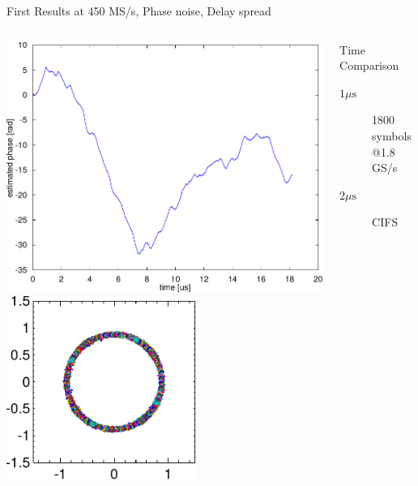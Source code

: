 \documentclass[10pt]{beamer}
\begin{document}
\begin{frame}{First Results at 450 MS/s, Phase noise, Delay spread}
  \begin{columns}[T]
    \begin{column}{.5\textwidth}
      \centering
      \includegraphics[width=\textwidth]{figures/matlab/res_450_qam4_phase_est} \\
      \includegraphics[width=0.6\textwidth]{figures/matlab/res_450_qam4_pnoise} \\
    \end{column}
    \begin{column}{.5\textwidth}
      \centering
      \begin{block}{Time Comparison}
        \begin{description}
        \item[$1 \mu \text{s}$] 1800 symbols @1.8 GS/s
        \item[$2 \mu \text{s}$] CIFS
        \end{description}
      \end{block}


\end{column}
\end{columns}
\end{frame}
\end{document}

